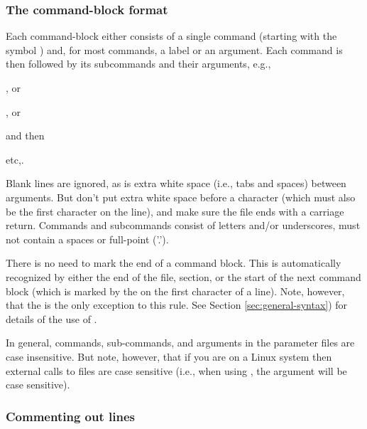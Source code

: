 \subsubsection{The command-block format}

Each command-block either consists of a single command (starting with the symbol \@) and, for most commands, a label or an argument. Each command is then followed by its subcommands and their arguments, e.g., 

\begin{description}
\item {}, or 
\item {} , or
\item {} 
\end{description}

and then
\begin{description}
\item {} 
\item {} 
\item etc,.
\end{description}

Blank lines are ignored, as is extra white space (i.e., tabs and spaces) between arguments. But don't put extra white space before a \command{} character (which must also be the first character on the line), and make sure the file ends with a carriage return. Commands and subcommands consist of letters and/or underscores, must not contain a spaces or full-point ('.').

There is no need to mark the end of a command block. This is automatically recognized by either the end of the file, section, or the start of the next command block (which is marked by the \command{} on the first character of a line). Note, however, that the  is the only exception to this rule. See Section \ref{sec:general-syntax}) for details of the use of . 

In general, commands, sub-commands, and arguments in the parameter files are case insensitive. But note, however, that if you are on a Linux system then external calls to files are case sensitive (i.e., when using  , the argument  will be case sensitive). 

\subsubsection{Commenting out lines}

